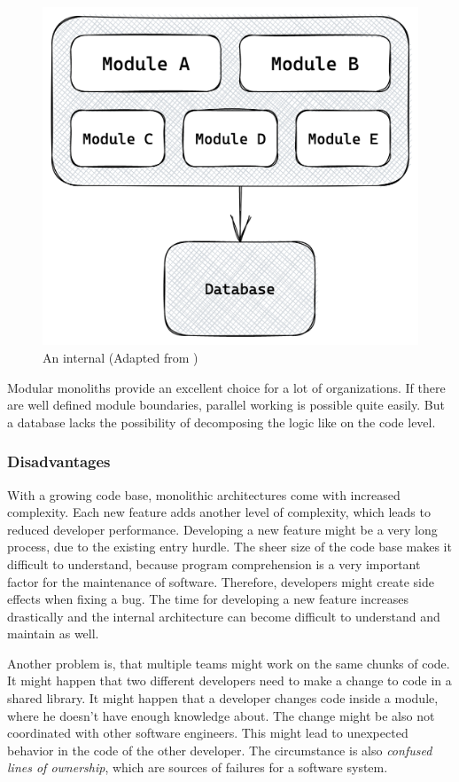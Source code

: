 \ifshowImages
\begin{figure}[H]
    \centering
    \includegraphics[width=0.5\linewidth]{images/background/monolith/modular-monolith-sketch.png}
    \caption{An internal (Adapted from \cite[13]{book:2019:newman:background:monolith:monolith-to-microservices})}\label{fig:background:monolith:module-monolith-sketch}
\end{figure}
\fi

\noindent Modular monoliths provide an excellent choice for a lot of organizations. If there are well defined module boundaries, parallel working is possible quite easily. But a database lacks the possibility of decomposing the logic like on the code level. \cite[12-13]{book:2019:newman:background:monolith:monolith-to-microservices}

\subsubsection{Disadvantages}

With a growing code base, monolithic architectures come with increased complexity. Each new feature adds another level of complexity, which leads to reduced developer performance. Developing a new feature might be a very long process, due to the existing entry hurdle. The sheer size of the code base makes it difficult to understand, because program comprehension is a very important factor for the maintenance of software. \cite{article:1995:mayrhauser:background:monoliths:program-comprehension-during-software-maintenance-and-evolution} Therefore, developers might create side effects when fixing a bug. The time for developing a new feature increases drastically and the internal architecture can become difficult to understand and maintain as well. \cite[4-6]{book:2018:richardson:background:bff:microservices-patterns}

\bigskip

\noindent Another problem is, that multiple teams might work on the same chunks of code. It might happen that two different developers need to make a change to code in a shared library. It might happen that a developer changes code inside a module, where he doesn't have enough knowledge about. The change might be also not coordinated with other software engineers. This might lead to unexpected behavior in the code of the other developer. The circumstance is also \textit{confused lines of ownership}, which are sources of failures for a software system. \cite[15]{book:2019:newman:background:monolith:monolith-to-microservices} \cite[7]{inproceedings:2011:bird:background:monoliths:dont-touch-my-code}


